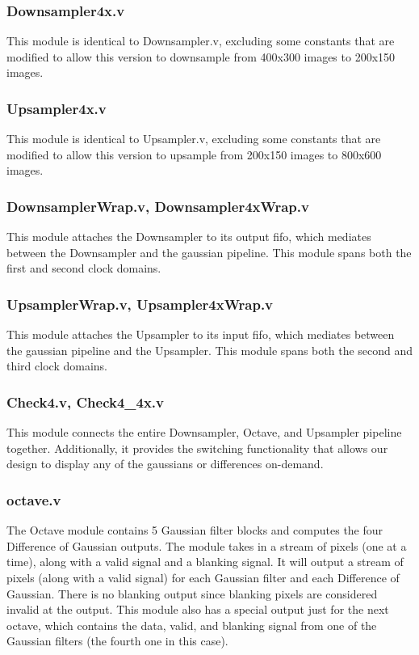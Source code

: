 \documentclass[11pt]{article}
\begin{document}
\subsubsection{Downsampler4x.v}
This module is identical to Downsampler.v, excluding some constants that are 
modified to allow this version to downsample from 400x300 images to 200x150 images.

\subsubsection{Upsampler4x.v}
This module is identical to Upsampler.v, excluding some constants that are 
modified to allow this version to upsample from 200x150 images to 800x600 images.

\subsubsection{DownsamplerWrap.v, Downsampler4xWrap.v}
This module attaches the Downsampler to its output fifo, which mediates between
the Downsampler and the gaussian pipeline. This module spans both the first
and second clock domains.

\subsubsection{UpsamplerWrap.v, Upsampler4xWrap.v}
This module attaches the Upsampler to its input fifo, which mediates between
the gaussian pipeline and the Upsampler. This module spans both the second and
third clock domains.

\subsubsection{Check4.v, Check4\_4x.v}
This module connects the entire Downsampler, Octave, and Upsampler pipeline together.
Additionally, it provides the switching functionality that allows our design to 
display any of the gaussians or differences on-demand.

\subsubsection{octave.v}
The Octave module contains 5 Gaussian filter blocks and computes the four 
Difference of Gaussian outputs. The module takes in a stream of pixels (one at 
a time), along with a valid signal and a blanking signal. It will output a 
stream of pixels (along with a valid signal) for each Gaussian filter and each 
Difference of Gaussian. There is no blanking output since blanking pixels are 
considered invalid at the output. This module also has a special output just 
for the next octave, which contains the data, valid, and blanking signal from 
one of the Gaussian filters (the fourth one in this case).
\end{document}
